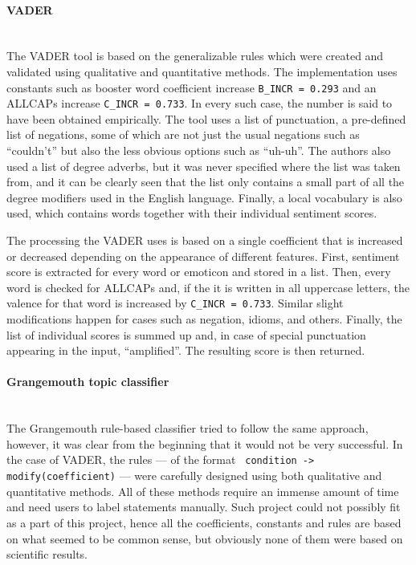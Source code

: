 \paragraph{VADER}\mbox{}\\
The VADER tool is based on the generalizable rules which were created and validated using qualitative
and quantitative methods. The implementation uses constants such as booster word coefficient increase \texttt{B\_INCR = 0.293} and an ALLCAPs increase \texttt{C\_INCR = 0.733}. In every such case, the number is said to have been obtained empirically. The tool uses a list of punctuation, a pre-defined list of negations, some of which are not just the usual negations such as ``couldn't'' but also the less obvious options such as ``uh-uh''. The authors also used a list of degree adverbs, but it was never specified where the list was taken from, and it can be clearly seen that the list only contains a small part of all the degree modifiers used in the English language. Finally, a local vocabulary is also used, which contains words together with their individual sentiment scores.

The processing the VADER uses is based on a single coefficient that is increased or decreased depending on the appearance of different features. First, sentiment score is extracted for every word or emoticon and stored in a list. Then, every word is checked for ALLCAPs and, if the it is written in all uppercase letters, the valence for that word is increased by \texttt{C\_INCR = 0.733}. Similar slight modifications happen for cases such as negation, idioms, and others. Finally, the list of individual scores is summed up and, in case of special punctuation appearing in the input, ``amplified''. The resulting score is then returned.

\paragraph{Grangemouth topic classifier}\mbox{}\\
The Grangemouth rule-based classifier tried to follow the same approach, however, it was clear from the beginning that it would not be very successful. In the case of VADER, the rules --- of the format \texttt{ condition -> modify(coefficient)} --- were carefully designed using both qualitative and quantitative methods. All of these methods require an immense amount of time and need users to label statements manually. Such project could not possibly fit as a part of this project, hence all the coefficients, constants and rules are based on what seemed to be common sense, but obviously none of them were based on scientific results. 

